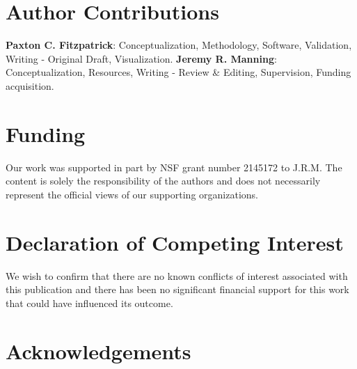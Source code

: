 \documentclass[preprint,12pt, a4paper]{elsarticle}
\begin{document}
\section*{Author Contributions}
\textbf{Paxton C. Fitzpatrick}: Conceptualization, Methodology, Software, Validation, Writing - Original Draft, Visualization. \textbf{Jeremy R. Manning}: Conceptualization, Resources, Writing - Review \& Editing, Supervision, Funding acquisition.

\section*{Funding}
Our work was supported in part by NSF grant number 2145172 to J.R.M. 
The content is solely the responsibility of the authors and does not necessarily represent the official views of our supporting organizations.


\section*{Declaration of Competing Interest}
We wish to confirm that there are no known conflicts of interest associated with this publication and there has been no significant financial support for this work that could have influenced its outcome.


\section*{Acknowledgements}


 

\end{document}
